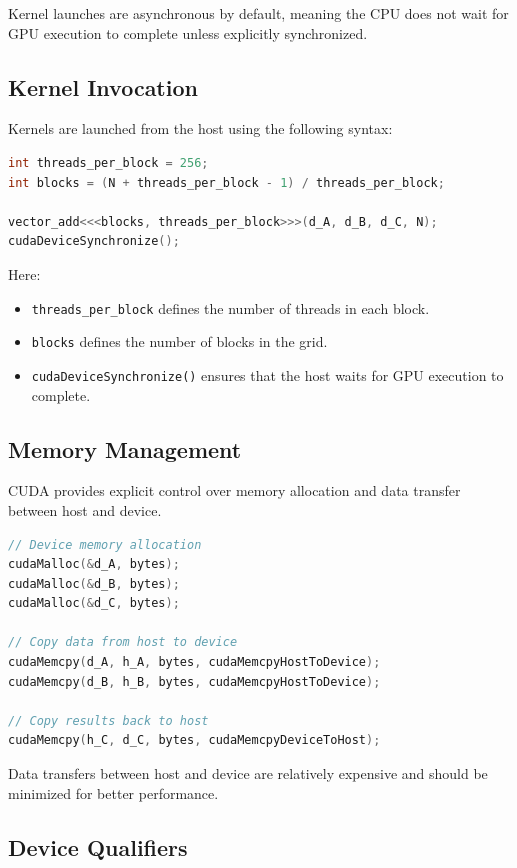 Kernel launches are asynchronous by default, meaning the CPU does not wait for GPU execution to complete unless explicitly synchronized.

\subsection{Kernel Invocation}

Kernels are launched from the host using the following syntax:

\begin{lstlisting}[language=C++]
int threads_per_block = 256;
int blocks = (N + threads_per_block - 1) / threads_per_block;

vector_add<<<blocks, threads_per_block>>>(d_A, d_B, d_C, N);
cudaDeviceSynchronize();
\end{lstlisting}

Here:
\begin{itemize}
    \item \texttt{threads\_per\_block} defines the number of threads in each block.
    \item \texttt{blocks} defines the number of blocks in the grid.
    \item \texttt{cudaDeviceSynchronize()} ensures that the host waits for GPU execution to complete.
\end{itemize}

\subsection{Memory Management}

CUDA provides explicit control over memory allocation and data transfer between host and device.

\begin{lstlisting}[language=C++]
// Device memory allocation
cudaMalloc(&d_A, bytes);
cudaMalloc(&d_B, bytes);
cudaMalloc(&d_C, bytes);

// Copy data from host to device
cudaMemcpy(d_A, h_A, bytes, cudaMemcpyHostToDevice);
cudaMemcpy(d_B, h_B, bytes, cudaMemcpyHostToDevice);

// Copy results back to host
cudaMemcpy(h_C, d_C, bytes, cudaMemcpyDeviceToHost);
\end{lstlisting}

Data transfers between host and device are relatively expensive and should be minimized for better performance.

\subsection{Device Qualifiers}

